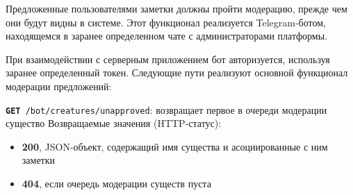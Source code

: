 \documentclass[12pt, a4paper]{article}
\begin{document}
Предложенные пользователями заметки должны пройти модерацию, прежде чем они будут видны в системе.
Этот функционал реализуется Telegram-ботом, находящемся в заранее определенном чате с администраторами платформы.

При взаимодействии с серверным приложением бот авторизуется, используя заранее определенный токен.
Следующие пути реализуют основной функционал модерации предложений:

\texttt{\textbf{GET} /bot/creatures/unapproved}: возвращает первое в очереди модерации существо
Возвращаемые значения (HTTP-статус):
\begin{itemize}
\item \textbf{200}, JSON-объект, содержащий имя существа и асоциированные с ним заметки
\item \textbf{404}, если очередь модерации существ пуста
\end{itemize}
\end{document}
